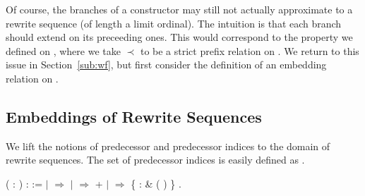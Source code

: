 Of course, the branches of a 
constructor may still not actually approximate to a rewrite sequence (of
length a limit ordinal). The intuition is that each branch should extend on
its preceeding ones. This would correspond to the
 property we defined on
, where we take $\prec$ to be a
strict prefix relation on
.
We return to this issue in Section~\ref{sub:wf}, but
first consider the definition of an embedding relation on
.


\subsection{Embeddings of Rewrite Sequences}

We lift the notions of predecessor and predecessor indices to the domain of
rewrite sequences. The set of predecessor indices is easily defined as
.
\begin{singlespace}
\begin{coqdoccode}
\coqdocnoindent
{}
 
(\coqdocvar{$\varphi$} : 
 ) :
 :=\coqdoceol
\coqdocindent{1.00em}
 \coqdocvariable{$\varphi$} \coqdoceol
\coqdocindent{1.00em}
\ensuremath{|}  \coqdocvar{\_}
\ensuremath{\Rightarrow}
\coqdoceol
\coqdocindent{1.00em}
\ensuremath{|} 
\coqdocvar{\_} \coqdocvar{\_} \coqdocvar{\_} \coqdocvar{$\psi$} \coqdocvar{\_}
\ensuremath{\Rightarrow}
+ 
\coqdocvariable{$\psi$}\coqdoceol
\coqdocindent{1.00em}
\ensuremath{|}  \coqdocvar{\_}
\coqdocvar{\_} \coqdocvar{\_}  \coqdocvar{\_}
\ensuremath{\Rightarrow} \{  :
\& 
( ) \}\coqdoceol
\coqdocindent{1.00em}
.\coqdoceol
\end{coqdoccode}
\end{singlespace}

